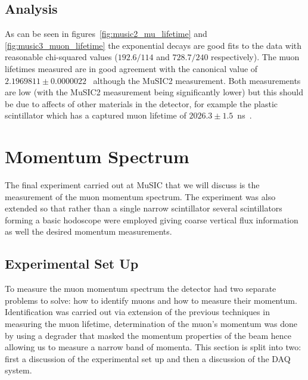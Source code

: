 \subsection{Analysis} %
\label{sec:analysis}
As can be seen in figures~\ref{fig:music2_mu_lifetime} and \ref{fig:music3_muon_lifetime} the exponential decays are good fits to the data with reasonable chi-squared values (\(192.6/114\) and \( 728.7/240 \) respectively). The muon lifetimes measured are in good agreement with the canonical value of \(2.1969811\pm0.0000022\)~\cite{PDG} although the MuSIC2 measurement. Both measurements are low (with the MuSIC2 measurement being significantly lower) but this should be due to affects of other materials in the detector, for example the plastic scintillator which has a captured muon lifetime of \(2026.3\pm1.5\)~ns~\cite{SUZUKI}. 

\section{Momentum Spectrum} %
\label{cha:momentum_spectrum}
The final experiment carried out at MuSIC that we will discuss is the measurement of the muon momentum spectrum. The experiment was also extended so that rather than a single narrow scintillator several scintillators forming a basic hodoscope were employed giving coarse vertical flux information as well the desired momentum measurements.

\subsection{Experimental Set Up} %
\label{sec:experimental_set_up}
To measure the muon momentum spectrum the detector had two separate problems to solve: how to identify muons and how to measure their momentum. Identification was carried out via extension of the previous techniques in measuring the muon lifetime, determination of the muon's momentum was done by using a degrader that masked the momentum properties of the beam hence allowing us to measure a narrow band of momenta. This section is split into two: first a discussion of the experimental set up and then a discussion of the DAQ system.

